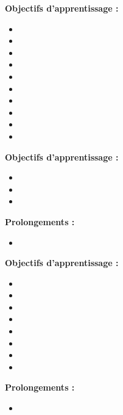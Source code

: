\par\noindent\textbf{Objectifs d'apprentissage :}
\begin{itemize}
    \item \useobj[C4A1ac]
    \item \useobj[C4A1aa]
    \item \useobj[C4A1ab]
    \item \useobj[C4A1bj]
    \item \useobj[C4A1ad]
    \item \useobj[C4A1ae]
    \item \useobj[C4A1af]
    \item \useobj[C4A1ag]
    \item \useobj[C4A1ah]
    \item \useobj[C4A1ak]
\end{itemize}
\endsequence

\par\noindent\textbf{Objectifs d'apprentissage :}
\begin{itemize}
    \item \useobj[C4B1eb]
    \item \useobj[C4B1ec]
    \item \useobj[C4B1eg]
\end{itemize}
\par\noindent\textbf{Prolongements :}
\begin{itemize}
    \item \usepro[C4B1eb]
\end{itemize}
\endsequence

\par\noindent\textbf{Objectifs d'apprentissage :}
\begin{itemize}
    \item \useobj[C4A1ba]
    \item \useobj[C4A1bb]
    \item \useobj[C4A1bc]
    \item \useobj[C4A1bd]
    \item \useobj[C4A1be]
    \item \useobj[C4A1bf]
    \item \useobj[C4B1aa]
    \item \useobj[C4B1ab]
\end{itemize}
\par\noindent\textbf{Prolongements :}
\begin{itemize}
    \item \usepro[C4A1ba]
\end{itemize}
\endsequence

